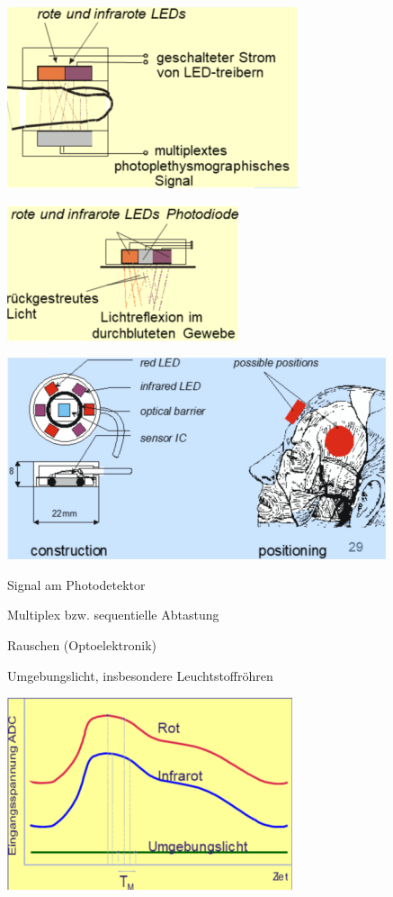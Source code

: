 \documentclass[a4paper]{article}
\begin{document}
\begin{multicols}{3}
  \begin{itemize*}
    \item \includegraphics[width=.5\linewidth]{Assets/Biosignalverarbeitung-pulsoxy-1.png}
    \item \includegraphics[width=.5\linewidth]{Assets/Biosignalverarbeitung-pulsoxy-2.png}
    \item \includegraphics[width=.5\linewidth]{Assets/Biosignalverarbeitung-pulsoxy-3.png}
  \end{itemize*}

  Signal am Photodetektor

  \begin{itemize*}
    \item Multiplex bzw. sequentielle Abtastung
    \item Rauschen (Optoelektronik)
    \item Umgebungslicht, insbesondere Leuchtstoffröhren
    \item \includegraphics[width=.5\linewidth]{Assets/Biosignalverarbeitung-pulsoxy-4.png}
  \end{itemize*}


\end{multicols}
\end{document}

